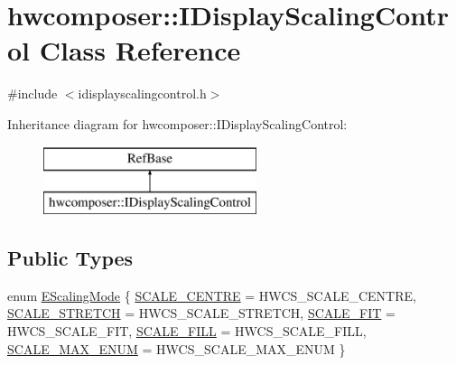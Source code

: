 \hypertarget{classhwcomposer_1_1IDisplayScalingControl}{}\section{hwcomposer\+:\+:I\+Display\+Scaling\+Control Class Reference}
\label{classhwcomposer_1_1IDisplayScalingControl}


{\ttfamily \#include $<$idisplayscalingcontrol.\+h$>$}

Inheritance diagram for hwcomposer\+:\+:I\+Display\+Scaling\+Control\+:\begin{figure}[H]
\begin{center}
\leavevmode
\includegraphics[height=2.000000cm]{classhwcomposer_1_1IDisplayScalingControl}
\end{center}
\end{figure}
\subsection*{Public Types}
\begin{DoxyCompactItemize}
\item 
enum \mbox{\hyperlink{classhwcomposer_1_1IDisplayScalingControl_a96b7ad3bec70da200ece1cd815807aab}{E\+Scaling\+Mode}} \{ \newline
\mbox{\hyperlink{classhwcomposer_1_1IDisplayScalingControl_a96b7ad3bec70da200ece1cd815807aaba51f3d108fdfe81971a4cf6ded8bb6227}{S\+C\+A\+L\+E\+\_\+\+C\+E\+N\+T\+RE}} = H\+W\+C\+S\+\_\+\+S\+C\+A\+L\+E\+\_\+\+C\+E\+N\+T\+RE, 
\mbox{\hyperlink{classhwcomposer_1_1IDisplayScalingControl_a96b7ad3bec70da200ece1cd815807aabaf3ef2341645b8973c40de2f1a65346de}{S\+C\+A\+L\+E\+\_\+\+S\+T\+R\+E\+T\+CH}} = H\+W\+C\+S\+\_\+\+S\+C\+A\+L\+E\+\_\+\+S\+T\+R\+E\+T\+CH, 
\mbox{\hyperlink{classhwcomposer_1_1IDisplayScalingControl_a96b7ad3bec70da200ece1cd815807aaba2a53b19fdbdedf81c19076e1ace09097}{S\+C\+A\+L\+E\+\_\+\+F\+IT}} = H\+W\+C\+S\+\_\+\+S\+C\+A\+L\+E\+\_\+\+F\+IT, 
\mbox{\hyperlink{classhwcomposer_1_1IDisplayScalingControl_a96b7ad3bec70da200ece1cd815807aabadabf7eb0f966f371bc37a29992a2576e}{S\+C\+A\+L\+E\+\_\+\+F\+I\+LL}} = H\+W\+C\+S\+\_\+\+S\+C\+A\+L\+E\+\_\+\+F\+I\+LL, 
\newline
\mbox{\hyperlink{classhwcomposer_1_1IDisplayScalingControl_a96b7ad3bec70da200ece1cd815807aaba4d197c09b66a1dbf7b725ece60bb0ef5}{S\+C\+A\+L\+E\+\_\+\+M\+A\+X\+\_\+\+E\+N\+UM}} = H\+W\+C\+S\+\_\+\+S\+C\+A\+L\+E\+\_\+\+M\+A\+X\+\_\+\+E\+N\+UM
 \}
\end{DoxyCompactItemize}
